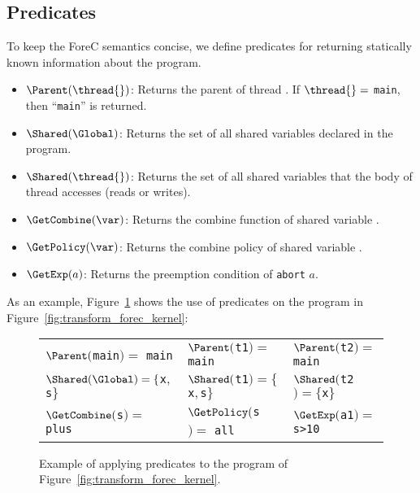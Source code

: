 
\subsection{Predicates}
To keep the ForeC semantics concise, we define predicates for returning 
statically known information about the program. 
\begin{itemize}
	\item $\Parent(\thread{})$:
		Returns the parent of thread \thread{}.
		If $\thread{} =$ \verb$main$, then ``\verb$main$'' is returned.
	\item $\Shared(\Global)$:
		Returns the set of all shared variables declared in the program.
	\item $\Shared(\thread{})$:
		Returns the set of all shared variables that the body of thread \thread{} accesses (reads or writes).
	\item $\GetCombine(\var)$:
		Returns the combine function of shared variable \var{}.
	\item $\GetPolicy(\var)$:
		Returns the combine policy of shared variable \var{}.
	\item $\GetExp(a)$:
		Returns the preemption condition \expression{} of \verb$abort$ $a$.
\end{itemize}
As an example, Figure~\ref{fig:forec_predicates} shows the use of predicates on
the program in Figure~\ref{fig:transform_forec_kernel}:
\begin{figure}[ht]
	\centering
	\renewcommand{\arraystretch}{1.25}
	\begin{tabular}{|l l l|}
		\hline
		$\Parent($\verb$main$$) =$ \verb$main$			& $\Parent($\verb$t1$$) =$ \verb$main$					& $\Parent($\verb$t2$$) =$ \verb$main$		\\
		$\Shared(\Global) = \{$\verb$x$$,$\verb$s$$\}$	& $\Shared($\verb$t1$$) = \{$\verb$x$$,$\verb$s$$\}$	& $\Shared($\verb$t2$$) = \{$\verb$x$$\}$	\\
		$\GetCombine($\verb$s$$) =$ \verb$plus$			& $\GetPolicy($\verb$s$$) =$ \verb$all$					& $\GetExp($\verb$a1$$) =$ \verb$s>10$		\\
		\hline
	\end{tabular}
	
	\caption{Example of applying predicates to the program of Figure~\ref{fig:transform_forec_kernel}.}
	\label{fig:forec_predicates}
\end{figure}



